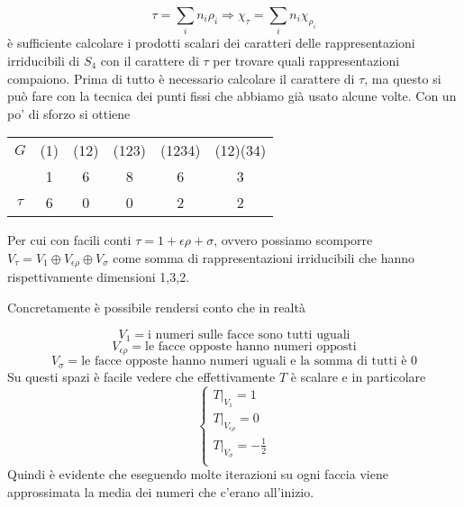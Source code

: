 \documentclass[11pt]{article}
\theoremstyle{plain}
\theoremstyle{definition}
\theoremstyle{remark}
\newcommand{\dsum}{\displaystyle\sum}
\begin{document}
\[\tau = \dsum_i n_i\rho_i \Rightarrow \chi_\tau  = \dsum_i n_i\chi_{\rho_i}\]
è sufficiente calcolare i prodotti scalari dei caratteri delle rappresentazioni irriducibili di $S_4$ con il carattere di $\tau$ per trovare quali rappresentazioni compaiono.
Prima di tutto è necessario calcolare il carattere di $\tau$, ma questo si può fare con la tecnica dei punti fissi che abbiamo già usato alcune volte.
Con un po' di sforzo si ottiene
\begin{table}[!ht]
\centering
\begin{tabular}{|c|c|c|c|c|c|}
\hline
$G$ & (1) & (12) &  (123) & (1234) & (12)(34)\\
  & 1   & 6    & 8      & 6      & 3\\
\hline
$\tau$  & 6   & 0    & 0      & 2      & 2\\
\hline
\end{tabular}
\end{table}

Per cui con facili conti $\tau = 1 + \epsilon\rho + \sigma$,
ovvero possiamo scomporre $V_\tau = V_1 \oplus V_{\epsilon\rho} \oplus V_{\sigma}$ come somma di rappresentazioni irriducibili
che hanno rispettivamente dimensioni 1,3,2.

Concretamente è possibile rendersi conto che in realtà

\[V_1 =  \text{i numeri sulle facce sono tutti uguali} \]
\[V_{\epsilon\rho} = \text{le facce opposte hanno numeri opposti}\]
\[V_{\sigma} = \text{le facce opposte hanno numeri uguali e la somma di tutti è 0}\]
Su questi spazi è facile vedere che effettivamente $T$ è scalare e in particolare
\[
\begin{cases}
T|_{V_1} = 1 \\
T|_{V_{\epsilon\rho}} = 0 \\
T|_{V_\sigma} = -\frac{1}{2}\\
\end{cases}
\]
Quindi è evidente che eseguendo molte iterazioni su ogni faccia viene approssimata la media dei numeri che c'erano all'inizio.








\newpage
\end{document}
